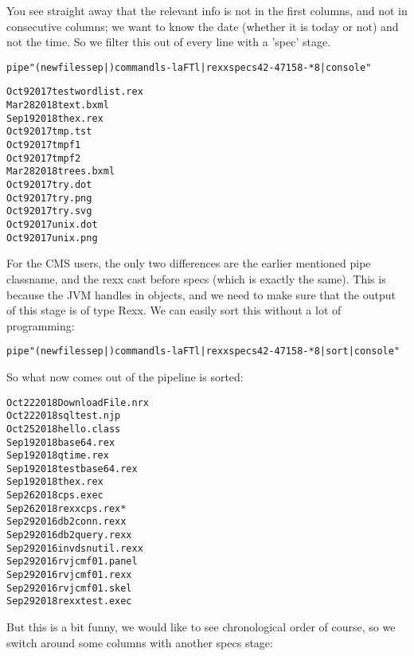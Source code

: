 You see straight away that the relevant info is not in the first columns, and not in consecutive columns; we want to know the date (whether it is today or not) and not the time. So we filter this out of every line with a 'spec' stage.
\begin{alltt}
pipe "(newfiles sep |) command ls -laFTl | rexx specs 42-47 1 58-* 8 | console"
\end{alltt}
\begin{alltt}
Oct 9 2017 testwordlist.rex
Mar 28 2018 text.bxml
Sep 19 2018 thex.rex
Oct 9 2017 tmp.tst
Oct 9 2017 tmpf1
Oct 9 2017 tmpf2
Mar 28 2018 trees.bxml
Oct 9 2017 try.dot
Oct 9 2017 try.png
Oct 9 2017 try.svg
Oct 9 2017 unix.dot
Oct 9 2017 unix.png
\end{alltt}
For the CMS users, the only two differences are the earlier mentioned pipe classname, and the rexx cast before specs (which is exactly the same). This is because the JVM handles in objects, and we need to make sure that the output of this stage is of type Rexx. 
We can easily sort this without a lot of programming:

\begin{alltt}
pipe "(newfiles sep |) command ls -laFTl | rexx specs 42-47 1 58-* 8 | sort | console"
\end{alltt}
So what now comes out of the pipeline is sorted:
\begin{alltt}
Oct 22 2018 DownloadFile.nrx
Oct 22 2018 sqltest.njp
Oct 25 2018 hello.class
Sep 19 2018 base64.rex
Sep 19 2018 qtime.rex
Sep 19 2018 testbase64.rex
Sep 19 2018 thex.rex
Sep 26 2018 cps.exec
Sep 26 2018 rexxcps.rex*
Sep 29 2016 db2conn.rexx
Sep 29 2016 db2query.rexx
Sep 29 2016 invdsnutil.rexx
Sep 29 2016 rvjcmf01.panel
Sep 29 2016 rvjcmf01.rexx
Sep 29 2016 rvjcmf01.skel
Sep 29 2018 rexxtest.exec
\end{alltt}
But this is a bit funny, we would like to see chronological order of course, so we switch around some columns with another specs stage:

